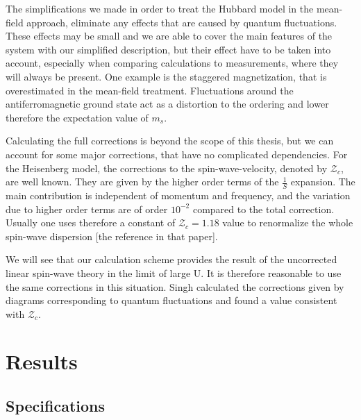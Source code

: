 \documentclass[a4paper,10pt]{report}
\begin{document}
The simplifications we made in order to treat the Hubbard model in the mean-field approach,  
eliminate any effects that are caused by quantum fluctuations.
These effects may be small and we are able to cover the main features of the system with our simplified description,
but their effect have to be taken into account, especially when comparing calculations to measurements, where they will always be present.
One example is the staggered magnetization, that is overestimated in the mean-field treatment. 
Fluctuations around the antiferromagnetic ground state act as a distortion to the ordering and lower therefore the expectation value of $m_s$.


Calculating the full corrections is beyond the scope of this thesis, but we can account for some major corrections, that have no complicated dependencies.
For the Heisenberg model, the corrections to the spin-wave-velocity, denoted by $\mathcal{Z}_c$, are well known.
They are given by the higher order terms of the $\frac1S$ expansion. 
The main contribution is independent of momentum and frequency, and the variation due to higher order terms are of order $10^{-2}$  compared to the total correction.
Usually one uses therefore a constant of $\mathcal{Z}_c=1.18$ value to renormalize the whole spin-wave dispersion [the reference in that paper].

We will see that our calculation scheme provides the result of the uncorrected linear spin-wave theory in the limit of large U. 
It is therefore reasonable to use the same corrections in this situation.
Singh calculated the corrections given by diagrams corresponding to quantum fluctuations and found a value consistent with $\mathcal{Z}_c$.





 
 
\chapter{Results}

\section{Specifications} %
\end{document}
